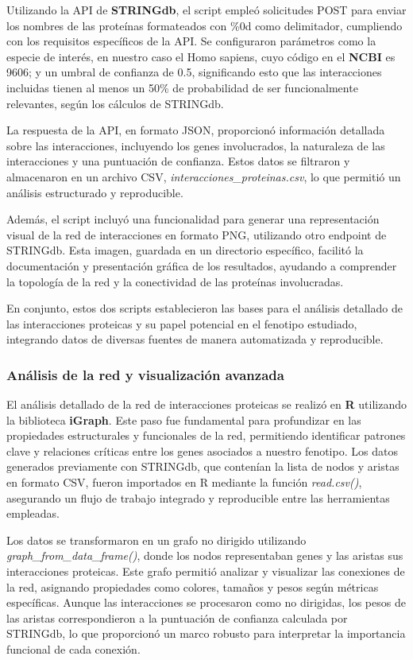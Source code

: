 Utilizando la API de \textbf{STRINGdb}, el script empleó solicitudes POST para enviar los nombres de las proteínas formateados con \%0d como delimitador, cumpliendo con los requisitos específicos de la API. Se configuraron parámetros como la especie de interés, en nuestro caso el Homo sapiens, cuyo código en el \textbf{NCBI} es 9606; y un umbral de confianza de 0.5, significando esto que las interacciones incluidas tienen al menos un 50\% de probabilidad de ser funcionalmente relevantes, según los cálculos de STRINGdb.

La respuesta de la API, en formato JSON, proporcionó información detallada sobre las interacciones, incluyendo los genes involucrados, la naturaleza de las interacciones y una puntuación de confianza. Estos datos se filtraron y almacenaron en un archivo CSV, \textit{interacciones\_proteinas.csv}, lo que permitió un análisis estructurado y reproducible.

Además, el script incluyó una funcionalidad para generar una representación visual de la red de interacciones en formato PNG, utilizando otro endpoint de STRINGdb. Esta imagen, guardada en un directorio específico, facilitó la documentación y presentación gráfica de los resultados, ayudando a comprender la topología de la red y la conectividad de las proteínas involucradas.

En conjunto, estos dos scripts establecieron las bases para el análisis detallado de las interacciones proteicas y su papel potencial en el fenotipo estudiado, integrando datos de diversas fuentes de manera automatizada y reproducible.

\subsubsection{Análisis de la red y visualización avanzada}

El análisis detallado de la red de interacciones proteicas se realizó en \textbf{R} utilizando la biblioteca \textbf{iGraph}. Este paso fue fundamental para profundizar en las propiedades estructurales y funcionales de la red, permitiendo identificar patrones clave y relaciones críticas entre los genes asociados a nuestro fenotipo. Los datos generados previamente con STRINGdb, que contenían la lista de nodos y aristas en formato CSV, fueron importados en R mediante la función \textit{read.csv()}, asegurando un flujo de trabajo integrado y reproducible entre las herramientas empleadas.

Los datos se transformaron en un grafo no dirigido utilizando \textit{graph\_from\_data\_frame()}, donde los nodos representaban genes y las aristas sus interacciones proteicas. Este grafo permitió analizar y visualizar las conexiones de la red, asignando propiedades como colores, tamaños y pesos según métricas específicas. Aunque las interacciones se procesaron como no dirigidas, los pesos de las aristas correspondieron a la puntuación de confianza calculada por STRINGdb, lo que proporcionó un marco robusto para interpretar la importancia funcional de cada conexión.

